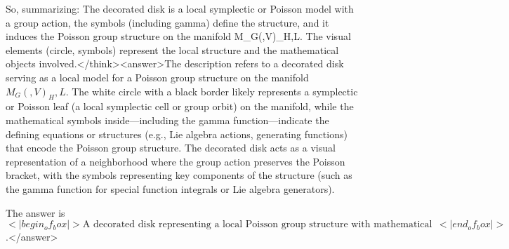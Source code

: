 So, summarizing: The decorated disk is a local symplectic or Poisson model with a group action, the symbols (including gamma) define the structure, and it induces the Poisson group structure on the manifold M_G(,V)_H,L. The visual elements (circle, symbols) represent the local structure and the mathematical objects involved.</think><answer>The description refers to a decorated disk serving as a local model for a Poisson group structure on the manifold \( M_G(,V)_H,L \). The white circle with a black border likely represents a symplectic or Poisson leaf (a local symplectic cell or group orbit) on the manifold, while the mathematical symbols inside—including the gamma function—indicate the defining equations or structures (e.g., Lie algebra actions, generating functions) that encode the Poisson group structure. The decorated disk acts as a visual representation of a neighborhood where the group action preserves the Poisson bracket, with the symbols representing key components of the structure (such as the gamma function for special function integrals or Lie algebra generators).  

The answer is \(<|begin_of_box|>\text{A decorated disk representing a local Poisson group structure with mathematical symbols (including a gamma function) defining the structure}<|end_of_box|>\).</answer>
